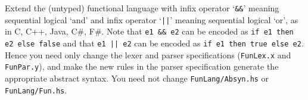 \documentclass[a4paper]{article}
\begin{document}
\begin{exercise}\label{exer-fun-sequential-logical}
  Extend the (untyped) functional language with infix operator
  `\verb|&&|' meaning sequential logical `and' and infix operator
  `\verb+||+' meaning sequential logical `or', as in C, C++, Java,
  C\#, F\#\@.  Note that \verb+e1 && e2+ can be encoded as \texttt{if
    e1 then e2 else false} and that \verb+e1 || e2+ can be encoded as
  \texttt{if e1 then true else e2}.  Hence you need only change the
  lexer and parser specifications (\texttt{FunLex.x} and \texttt{FunPar.y}), and make the new rules in the
  parser specification generate the appropriate abstract syntax.  You
  need not change \texttt{FunLang/Absyn.hs} or \texttt{FunLang/Fun.hs}\@.\\
  


\end{exercise}
\end{document}
